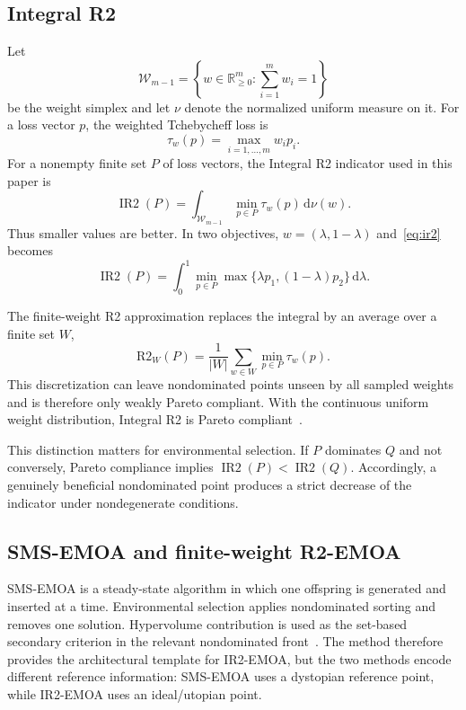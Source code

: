 \documentclass[runningheads]{llncs}
\newcommand{\IR}{\operatorname{IR2}}
\newcommand{\Rtwo}{\mathrm{R2}}
\newcommand{\R}{\mathbb{R}}
\begin{document}
\subsection{Integral R2}
\label{subsec:ir2}

Let
\begin{equation}
    \mathcal{W}_{m-1}
    =\left\{w\in\R_{\ge0}^{m}:\sum_{i=1}^{m}w_i=1\right\}
\end{equation}
be the weight simplex and let $\nu$ denote the normalized uniform measure on it. For a loss vector $p$, the weighted Tchebycheff loss is
\begin{equation}
    \tau_w(p)=\max_{i=1,\ldots,m} w_i p_i.
\end{equation}
For a nonempty finite set $P$ of loss vectors, the Integral R2 indicator used in this paper is
\begin{equation}
\label{eq:ir2}
    \IR(P)
    =\int_{\mathcal{W}_{m-1}}
      \min_{p\in P}\tau_w(p)\,\mathrm{d}\nu(w).
\end{equation}
Thus smaller values are better. In two objectives, $w=(\lambda,1-\lambda)$ and~\eqref{eq:ir2} becomes
\begin{equation}
\label{eq:ir2-2d}
    \IR(P)=\int_0^1
    \min_{p\in P}
    \max\{\lambda p_1,(1-\lambda)p_2\}\,\mathrm{d}\lambda.
\end{equation}

The finite-weight R2 approximation replaces the integral by an average over a finite set $W$,
\begin{equation}
\label{eq:finite-r2}
    \Rtwo_W(P)=\frac{1}{|W|}\sum_{w\in W}\min_{p\in P}\tau_w(p).
\end{equation}
This discretization can leave nondominated points unseen by all sampled weights and is therefore only weakly Pareto compliant. With the continuous uniform weight distribution, Integral R2 is Pareto compliant~\cite{SchaepermeierKerschke2025,JaszkiewiczZielniewicz2025}.

This distinction matters for environmental selection. If $P$ dominates $Q$ and not conversely, Pareto compliance implies $\IR(P)<\IR(Q)$. Accordingly, a genuinely beneficial nondominated point produces a strict decrease of the indicator under nondegenerate conditions.

\subsection{SMS-EMOA and finite-weight R2-EMOA}

SMS-EMOA is a steady-state algorithm in which one offspring is generated and inserted at a time. Environmental selection applies nondominated sorting and removes one solution. Hypervolume contribution is used as the set-based secondary criterion in the relevant nondominated front~\cite{BeumeNaujoksEmmerich2007}. The method therefore provides the architectural template for IR2-EMOA, but the two methods encode different reference information: SMS-EMOA uses a dystopian reference point, while IR2-EMOA uses an ideal/utopian point.
\end{document}
